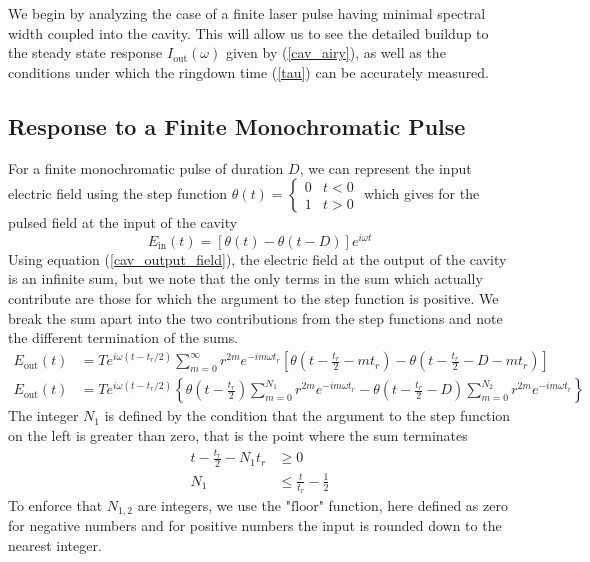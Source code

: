 We begin by analyzing the case of a finite laser pulse having minimal spectral width coupled into the cavity. This will allow us to see the detailed buildup to the steady state response $I_\mathrm{out}(\omega)$ given by (\ref{cav_airy}), as well as the conditions under which the ringdown time (\ref{tau}) can be accurately measured.

\subsection{Response to a Finite Monochromatic Pulse}
For a finite monochromatic pulse of duration $D$, we can represent the input electric field using the step function $\theta(t) = \begin{cases}0 & t<0 \\1 &t>0 \end{cases}$ which gives for the pulsed field at the input of the cavity
\begin{equation}
	E_\mathrm{in}(t) = \left[\theta(t) - \theta(t-D)\right]e^{i\omega t}
\end{equation}
Using equation (\ref{cav_output_field}), the electric field at the output of the cavity is an infinite sum, but we note that the only terms in the sum which actually contribute are those for which the argument to the step function is positive. We break the sum apart into the two contributions from the step functions and note the different termination of the sums.
\begin{align}
	E_\mathrm{out}(t) &= T e^{i\omega \left(t - t_r/2\right)} \sum_{m=0}^{\infty}r^{2m}e^{-im\omega t_r}\left[ \theta\left(t-\frac{t_r}{2} - mt_r\right) - \theta\left(t-\frac{t_r}{2} - D - mt_r\right) \right] \\
	E_\mathrm{out}(t) &= T e^{i\omega \left(t - t_r/2\right)}\left\{\theta\left(t-\frac{t_r}{2}\right)\sum_{m=0}^{N_1}r^{2m}e^{-im\omega t_r} - \theta\left(t-\frac{t_r}{2} - D\right)\sum_{m=0}^{N_2}r^{2m}e^{-im\omega t_r}\right\}
\end{align}
The integer $N_1$ is defined by the condition that the argument to the step function on the left is greater than zero, that is the point where the sum terminates
\begin{align}
	t - \frac{t_r}{2} -N_1 t_r &\geq 0 \\
	N_1 &\leq \frac{t}{t_r} - \frac{1}{2}
\end{align}
To enforce that $N_{1,2}$ are integers, we use the "$\mathrm{floor}$" function, here defined as zero for negative numbers and for positive numbers the input is rounded down to the nearest integer. 
